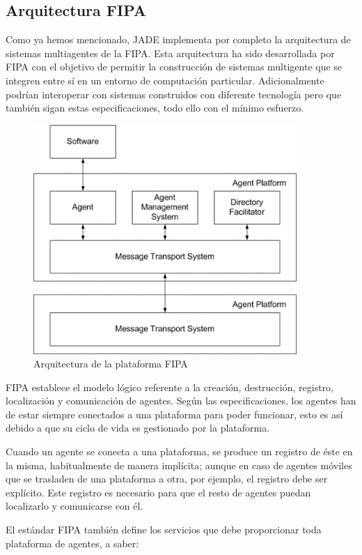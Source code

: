 \subsection*{Arquitectura FIPA}

Como ya hemos mencionado, JADE implementa por completo la arquitectura de
sistemas multiagentes de la FIPA. Esta arquitectura ha sido desarrollada por
FIPA con el objetivo de permitir la construcción de sistemas multigente que se
integren entre sí en un entorno de computación particular. Adicionalmente
podrían interoperar con sistemas construidos con diferente tecnología pero que
también sigan estas especificaciones, todo ello con el mínimo esfuerzo.

\begin{figure}[H]
 \centering
 \includegraphics[width=100mm]{figuras/cap4/fipa.png}
 \caption{Arquitectura de la plataforma FIPA}
\end{figure}

FIPA establece el modelo lógico referente a la creación, destrucción, registro,
localización y comunicación de agentes. Según las especificaciones, los agentes
han de estar siempre conectados a una plataforma para poder funcionar, esto es
así debido a que su ciclo de vida es gestionado por la plataforma.

Cuando un agente se conecta a una plataforma, se produce un registro de éste
en la misma, habitualmente de manera implícita; aunque en caso de agentes
móviles que se trasladen de una plataforma a otra, por ejemplo, el registro debe
ser explícito. Este registro es necesario para que el resto de agentes puedan
localizarlo y comunicarse con él.

El estándar FIPA también define los servicios que debe proporcionar toda
plataforma de agentes, a saber:

